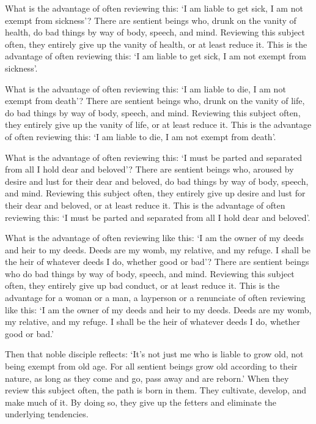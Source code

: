 \documentclass[12pt,openany]{book}%
\begin{document}
What is the advantage of often reviewing this: ‘I am liable to get sick, I am not exempt from sickness’? There are sentient beings who, drunk on the vanity of health, do bad things by way of body, speech, and mind. Reviewing this subject often, they entirely give up the vanity of health, or at least reduce it. This is the advantage of often reviewing this: ‘I am liable to get sick, I am not exempt from sickness’. 

What is the advantage of often reviewing this: ‘I am liable to die, I am not exempt from death’? There are sentient beings who, drunk on the vanity of life, do bad things by way of body, speech, and mind. Reviewing this subject often, they entirely give up the vanity of life, or at least reduce it. This is the advantage of often reviewing this: ‘I am liable to die, I am not exempt from death’. 

What is the advantage of often reviewing this: ‘I must be parted and separated from all I hold dear and beloved’? There are sentient beings who, aroused by desire and lust for their dear and beloved, do bad things by way of body, speech, and mind. Reviewing this subject often, they entirely give up desire and lust for their dear and beloved, or at least reduce it. This is the advantage of often reviewing this: ‘I must be parted and separated from all I hold dear and beloved’. 

What is the advantage of often reviewing like this: ‘I am the owner of my deeds and heir to my deeds. Deeds are my womb, my relative, and my refuge. I shall be the heir of whatever deeds I do, whether good or bad’? There are sentient beings who do bad things by way of body, speech, and mind. Reviewing this subject often, they entirely give up bad conduct, or at least reduce it. This is the advantage for a woman or a man, a layperson or a renunciate of often reviewing like this: ‘I am the owner of my deeds and heir to my deeds. Deeds are my womb, my relative, and my refuge. I shall be the heir of whatever deeds I do, whether good or bad.’ 

Then that noble disciple reflects: ‘It’s not just me who is liable to grow old, not being exempt from old age. For all sentient beings grow old according to their nature, as long as they come and go, pass away and are reborn.’ When they review this subject often, the path is born in them. They cultivate, develop, and make much of it. By doing so, they give up the fetters and eliminate the underlying tendencies. 
\end{document}
